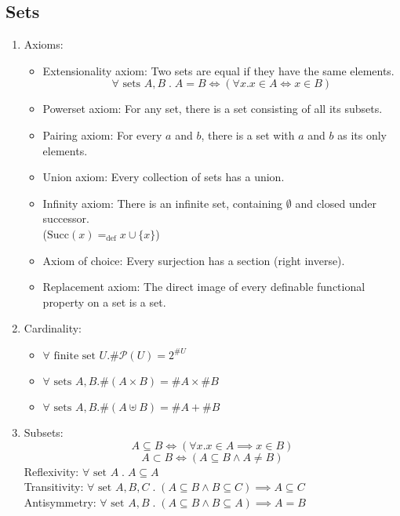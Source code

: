 \documentclass{article}
\begin{document}
\subsection{Sets}
\begin{enumerate}
    \item Axioms:
        \begin{itemize}[label={-},topsep=0pt]
            \item Extensionality axiom: Two sets are equal if they have the same elements.
                $$\forall\text{ sets }A, B\;.\;A=B\Longleftrightarrow(\forall x.x\in A\Longleftrightarrow x\in B)$$
            \item Powerset axiom: For any set, there is a set consisting of all its subsets.
            \item Pairing axiom: For every $a$ and $b$, there is a set with $a$ and $b$ as its only elements.
            \item Union axiom: Every collection of sets has a union.
            \item Infinity axiom: There is an infinite set, containing $\emptyset$ and closed under successor. \\($\text{Succ}(x)=_\text{def}x\cup\{x\}$)
            \item Axiom of choice: Every surjection has a section (right inverse).
            \item Replacement axiom: The direct image of every definable functional property on a set is a set.
        \end{itemize}
    \item Cardinality:
        \begin{itemize}[label={-},topsep=0pt]
            \item $\forall\text{ finite set }U.\#\mathcal{P}(U)=2^{\#U}$
            \item $\forall\text{ sets }A,B.\#(A\times B)=\#A\times\#B$
            \item $\forall\text{ sets }A,B.\#(A\uplus B)=\#A+\#B$
        \end{itemize}
    \item Subsets:
        $$A\subseteq B\Longleftrightarrow(\forall x.x\in A\implies x\in B)$$
        $$A\subset B\Longleftrightarrow(A\subseteq B\wedge A\neq B)$$
        Reflexivity: $\forall\text{ set }A\;.\;A\subseteq A$\\
        Transitivity: $\forall\text{ set }A,B,C\;.\;(A\subseteq B\wedge B\subseteq C)\implies A\subseteq C$\\
        Antisymmetry: $\forall\text{ set }A,B\;.\;(A\subseteq B\wedge B\subseteq A)\implies A=B$

\end{enumerate}
\end{document}
